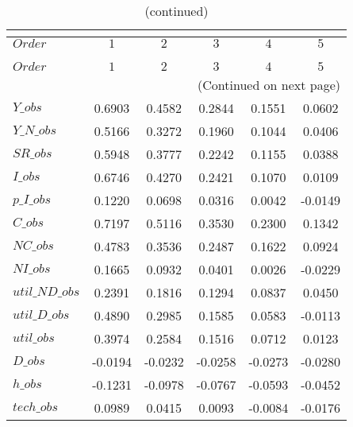  
\begin{center}
\begin{longtable}{lccccc} 
\caption{COEFFICIENTS OF AUTOCORRELATION}\\
 \label{Table:th_autocorr_matrix}\\
\toprule 
$Order          $	 & 	 $          1$	 & 	 $          2$	 & 	 $          3$	 & 	 $          4$	 & 	 $          5$\\
\midrule \endfirsthead 
\caption{(continued)}\\
 \toprule \\ 
$Order          $	 & 	 $          1$	 & 	 $          2$	 & 	 $          3$	 & 	 $          4$	 & 	 $          5$\\
\midrule \endhead 
\midrule \multicolumn{6}{r}{(Continued on next page)} \\ \bottomrule \endfoot 
\bottomrule \endlastfoot 
$Y\_obs         $	 & 	     0.6903	 & 	     0.4582	 & 	     0.2844	 & 	     0.1551	 & 	     0.0602 \\ 
$Y\_N\_obs      $	 & 	     0.5166	 & 	     0.3272	 & 	     0.1960	 & 	     0.1044	 & 	     0.0406 \\ 
$SR\_obs        $	 & 	     0.5948	 & 	     0.3777	 & 	     0.2242	 & 	     0.1155	 & 	     0.0388 \\ 
$I\_obs         $	 & 	     0.6746	 & 	     0.4270	 & 	     0.2421	 & 	     0.1070	 & 	     0.0109 \\ 
$p\_I\_obs      $	 & 	     0.1220	 & 	     0.0698	 & 	     0.0316	 & 	     0.0042	 & 	    -0.0149 \\ 
$C\_obs         $	 & 	     0.7197	 & 	     0.5116	 & 	     0.3530	 & 	     0.2300	 & 	     0.1342 \\ 
$NC\_obs        $	 & 	     0.4783	 & 	     0.3536	 & 	     0.2487	 & 	     0.1622	 & 	     0.0924 \\ 
$NI\_obs        $	 & 	     0.1665	 & 	     0.0932	 & 	     0.0401	 & 	     0.0026	 & 	    -0.0229 \\ 
$util\_ND\_obs  $	 & 	     0.2391	 & 	     0.1816	 & 	     0.1294	 & 	     0.0837	 & 	     0.0450 \\ 
$util\_D\_obs   $	 & 	     0.4890	 & 	     0.2985	 & 	     0.1585	 & 	     0.0583	 & 	    -0.0113 \\ 
$util\_obs      $	 & 	     0.3974	 & 	     0.2584	 & 	     0.1516	 & 	     0.0712	 & 	     0.0123 \\ 
$D\_obs         $	 & 	    -0.0194	 & 	    -0.0232	 & 	    -0.0258	 & 	    -0.0273	 & 	    -0.0280 \\ 
$h\_obs         $	 & 	    -0.1231	 & 	    -0.0978	 & 	    -0.0767	 & 	    -0.0593	 & 	    -0.0452 \\ 
$tech\_obs      $	 & 	     0.0989	 & 	     0.0415	 & 	     0.0093	 & 	    -0.0084	 & 	    -0.0176 \\ 
\end{longtable}
 \end{center}
